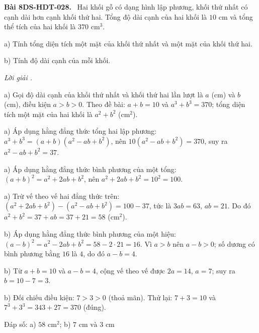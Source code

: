 \documentclass[12pt,a4paper]{article}
\newenvironment{problem}[1][]{\par\medskip\noindent\textbf{Bài #1.}\ }{\par}
\newenvironment{solution}[1][]{\par\noindent\textit{Lời giải #1.}\par}{\par}
\begin{document}
\begin{problem}[8DS-HDT-028]
Hai khối gỗ có dạng hình lập phương, khối thứ nhất có cạnh dài hơn cạnh khối thứ hai. Tổng độ dài cạnh của hai khối là $10$ cm và tổng thể tích của hai khối là $370$ cm$^3$.

a) Tính tổng diện tích một mặt của khối thứ nhất và một mặt của khối thứ hai.

b) Tính độ dài cạnh của mỗi khối.

\begin{solution}
a) Gọi độ dài cạnh của khối thứ nhất và khối thứ hai lần lượt là $a$ (cm) và $b$ (cm), điều kiện $a > b > 0$. Theo đề bài: $a + b = 10$ và $a^3 + b^3 = 370$; tổng diện tích một mặt của hai khối là $a^2 + b^2$ (cm$^2$).

a) Áp dụng hằng đẳng thức tổng hai lập phương: $a^3 + b^3 = (a + b)(a^2 - ab + b^2)$, nên $10(a^2 - ab + b^2) = 370$, suy ra $a^2 - ab + b^2 = 37$.

a) Áp dụng hằng đẳng thức bình phương của một tổng: $(a + b)^2 = a^2 + 2ab + b^2$, nên $a^2 + 2ab + b^2 = 10^2 = 100$.

a) Trừ vế theo vế hai đẳng thức trên: $(a^2 + 2ab + b^2) - (a^2 - ab + b^2) = 100 - 37$, tức là $3ab = 63$, $ab = 21$. Do đó $a^2 + b^2 = 37 + ab = 37 + 21 = 58$ (cm$^2$).

b) Áp dụng hằng đẳng thức bình phương của một hiệu: $(a - b)^2 = a^2 - 2ab + b^2 = 58 - 2 \cdot 21 = 16$. Vì $a > b$ nên $a - b > 0$; số dương có bình phương bằng $16$ là $4$, do đó $a - b = 4$.

b) Từ $a + b = 10$ và $a - b = 4$, cộng vế theo vế được $2a = 14$, $a = 7$; suy ra $b = 10 - 7 = 3$.

b) Đối chiếu điều kiện: $7 > 3 > 0$ (thoả mãn). Thử lại: $7 + 3 = 10$ và $7^3 + 3^3 = 343 + 27 = 370$ (đúng).

Đáp số: a) $\boxed{58 \text{ cm}^2}$; b) $\boxed{7 \text{ cm và } 3 \text{ cm}}$
\end{solution}
\end{problem}
\end{document}
